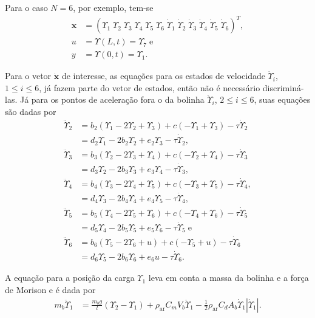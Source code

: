  Para o caso $N=6$, por exemplo, tem-se \begin{align}
\mathbf{x} &= \left(\Upsilon_1\;\Upsilon_2\;\Upsilon_3\;\Upsilon_4\;\Upsilon_5\;\Upsilon_6\;\dot{\Upsilon}_1\;\dot{\Upsilon}_2\;\dot{\Upsilon}_3\;\dot{\Upsilon}_4\;\dot{\Upsilon}_5\;\dot{\Upsilon}_6\right)^T, 	\\
u &= \Upsilon(L,t) = \Upsilon_7\label{ufor6}\;\mathrm{e}\\
y &= \Upsilon(0,t) = \Upsilon_1\label{yfor6}.
 \end{align} 
 
 Para o vetor $\mathbf{\dot{x}}$ de interesse, as equações para os estados de velocidade $\dot{\Upsilon}_i$, $1 \le i \le 6$, já fazem parte do vetor de estados, então não é necessário discriminá-las. Já para os pontos de aceleração fora o da bolinha $\ddot{\Upsilon}_i$, $2 \le i \le 6$, suas equações são dadas por \begin{align}
 	\ddot{\Upsilon}_2 &=  b_2\left(\Upsilon_{1}-2\Upsilon_{2} + \Upsilon_{3}\right)+c(-\Upsilon_1 + \Upsilon_3)-\tau \dot{\Upsilon}_2\nonumber \\
 	&= d_2\Upsilon_1 - 2b_2 \Upsilon_2 + e_2\Upsilon_3 - \tau \dot{\Upsilon}_2, \label{upsilon2}\\
 	\ddot{\Upsilon}_3 &=  b_3\left(\Upsilon_{2}-2\Upsilon_{3} + \Upsilon_{4}\right)+c(-\Upsilon_2 + \Upsilon_4)-\tau \dot{\Upsilon}_3\nonumber \\
 	&= d_3\Upsilon_2 - 2b_3 \Upsilon_3 + e_3\Upsilon_4 - \tau \dot{\Upsilon}_3,\\
 	\ddot{\Upsilon}_4 &=  b_4\left(\Upsilon_{3}-2\Upsilon_{4} + \Upsilon_{5}\right)+c(-\Upsilon_3 + \Upsilon_5)-\tau \dot{\Upsilon}_4, \nonumber\\
 	&= d_4\Upsilon_3 - 2b_4 \Upsilon_4 + e_4\Upsilon_5 - \tau \dot{\Upsilon}_4,\\
 	\ddot{\Upsilon}_5 &=  b_5\left(\Upsilon_{4}-2\Upsilon_{5} + \Upsilon_{6}\right)+c(-\Upsilon_4 + \Upsilon_6)-\tau \dot{\Upsilon}_5\nonumber\\
 	&= d_5\Upsilon_4 - 2b_5 \Upsilon_5 + e_5\Upsilon_6 - \tau \dot{\Upsilon}_5\;\mathrm{e}\\
 	\ddot{\Upsilon}_6 &=  b_6\left(\Upsilon_{5}-2\Upsilon_{6} + u\right)+c(-\Upsilon_5 + u)-\tau \dot{\Upsilon}_6\nonumber\\
 	&= d_6\Upsilon_5 - 2b_6 \Upsilon_6 + e_6 u - \tau \dot{\Upsilon}_6. \label{upsilon6}
 \end{align}

 A equação para a posição da carga $\Upsilon_1$ leva em conta a massa da bolinha e a força de Morison e é dada por \begin{align}
 	m_b \ddot{\Upsilon}_1 &= \frac{m_b g}{l}\left(\Upsilon_2 - \Upsilon_1\right) + \rho_{\mathrm{ar}} C_m V_b \ddot{\Upsilon}_1 - \frac{1}{2}\rho_{\textrm{ar}} C_d A_b \dot{\Upsilon}_1 \left|\dot{\Upsilon}_1\right|.\label{upsilon1previa}
 \end{align} 
 
